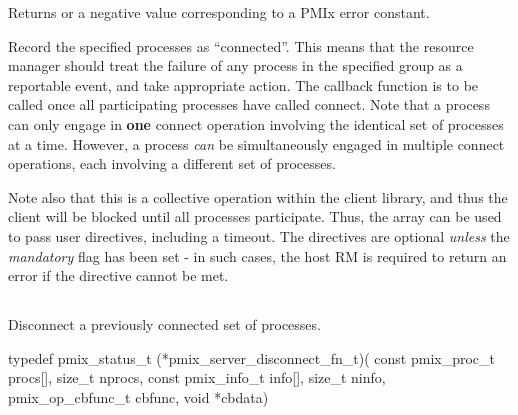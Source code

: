 Returns  or a negative value corresponding to a PMIx error constant.

\descr

Record the specified processes as ``connected''.
This means that the resource manager should treat the failure of any process in the specified group as a reportable event, and take appropriate action.
The callback function is to be called once all participating processes have called connect.
Note that a process can only engage in \textbf{one} connect operation involving the identical set of processes at a time.
However, a process \emph{can} be simultaneously engaged in multiple connect operations, each involving a different set of processes.

Note also that this is a collective operation within the client library, and thus the client will be blocked until all processes participate.
Thus, the  array can be used to pass user directives, including a timeout.
The directives are optional \emph{unless} the \emph{mandatory} flag has been set - in such cases, the host RM is required to return an error if the directive cannot be met.


\subsection{}

\summary

Disconnect a previously connected set of processes.

\format

\cspecificstart
\begin{codepar}
typedef pmix_status_t (*pmix_server_disconnect_fn_t)(
                             const pmix_proc_t procs[], size_t nprocs,
                             const pmix_info_t info[], size_t ninfo,
                             pmix_op_cbfunc_t cbfunc, void *cbdata)
\end{codepar}
\cspecificend

\begin{arglist}
\end{arglist}

